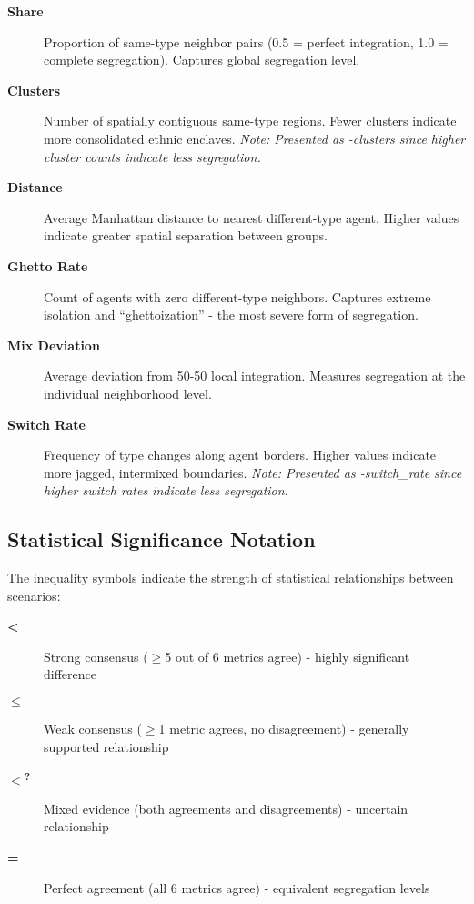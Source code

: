 \begin{description}
\item[\textbf{Share}] Proportion of same-type neighbor pairs (0.5 = perfect integration, 1.0 = complete segregation). Captures global segregation level.

\item[\textbf{Clusters}] Number of spatially contiguous same-type regions. Fewer clusters indicate more consolidated ethnic enclaves. \textit{Note: Presented as -clusters since higher cluster counts indicate less segregation.}

\item[\textbf{Distance}] Average Manhattan distance to nearest different-type agent. Higher values indicate greater spatial separation between groups.

\item[\textbf{Ghetto Rate}] Count of agents with zero different-type neighbors. Captures extreme isolation and ``ghettoization'' - the most severe form of segregation.

\item[\textbf{Mix Deviation}] Average deviation from 50-50 local integration. Measures segregation at the individual neighborhood level.

\item[\textbf{Switch Rate}] Frequency of type changes along agent borders. Higher values indicate more jagged, intermixed boundaries. \textit{Note: Presented as -switch\_rate since higher switch rates indicate less segregation.}
\end{description}

\subsection*{Statistical Significance Notation}

The inequality symbols indicate the strength of statistical relationships between scenarios:

\begin{description}
\item[\textbf{<}] Strong consensus ($\geq$5 out of 6 metrics agree) - highly significant difference
\item[\textbf{$\leq$}] Weak consensus ($\geq$1 metric agrees, no disagreement) - generally supported relationship  
\item[\textbf{$\leq$\textsuperscript{?}}] Mixed evidence (both agreements and disagreements) - uncertain relationship
\item[\textbf{=}] Perfect agreement (all 6 metrics agree) - equivalent segregation levels
\end{description}

